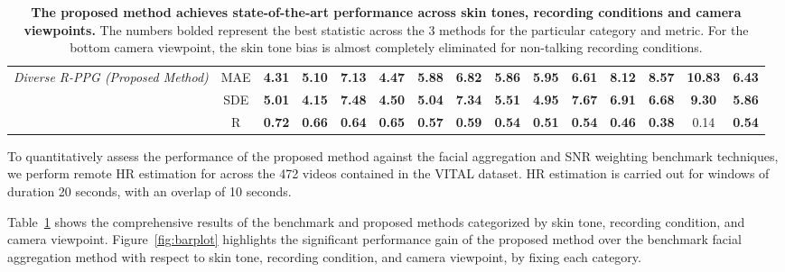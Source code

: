 \begin{table}[]
\begin{center}
{\begin{tabular}{c|c|ccccccccccccc}
\multirow{3}{3.5cm}{\textit{Diverse R-PPG (Proposed Method)}} & MAE & \textbf{4.31} & \textbf{5.10} & \multicolumn{1}{c|}{\textbf{7.13}} & \textbf{4.47} & \textbf{5.88} & \multicolumn{1}{c|}{\textbf{6.82}} & \textbf{5.86} & \textbf{5.95} & \multicolumn{1}{c|}{\textbf{6.61}} & \textbf{8.12} & \textbf{8.57} & \multicolumn{1}{c|}{\textbf{10.83}} & \textbf{6.43} \\
 & SDE & \textbf{5.01} & \textbf{4.15} & \multicolumn{1}{c|}{\textbf{7.48}} & \textbf{4.50} & \textbf{5.04} & \multicolumn{1}{c|}{\textbf{7.34}} & \textbf{5.51} & \textbf{4.95} & \multicolumn{1}{c|}{\textbf{7.67}} & \textbf{6.91} & \textbf{6.68} & \multicolumn{1}{c|}{\textbf{9.30}} & \textbf{5.86} \\
 & R & \textbf{0.72} & \textbf{0.66} & \multicolumn{1}{c|}{\textbf{0.64}} & \textbf{0.65} & \textbf{0.57} & \multicolumn{1}{c|}{\textbf{0.59}} & \textbf{0.54} & \textbf{0.51} & \multicolumn{1}{c|}{\textbf{0.54}} & \textbf{0.46} & \textbf{0.38} & \multicolumn{1}{c|}{0.14} & \textbf{0.54} \\ 
\end{tabular}}
\end{center}
\caption{\textbf{The proposed method achieves state-of-the-art performance across skin tones, recording conditions and camera viewpoints.} The numbers bolded represent the best statistic across the 3 methods for the particular category and metric. For the bottom camera viewpoint, the skin tone bias is almost completely eliminated for non-talking recording conditions.}
\label{tab:results}
\end{table}
    

To quantitatively assess the performance of the proposed method against the facial aggregation and SNR weighting benchmark techniques, we perform remote HR estimation for across the 472 videos contained in the VITAL dataset. HR estimation is carried out for windows of duration 20 seconds, with an overlap of 10 seconds. 

Table~\ref{tab:results} shows the comprehensive results of the benchmark and proposed methods categorized by skin tone, recording condition, and camera viewpoint. Figure~\ref{fig:barplot} highlights the significant performance gain of the proposed method over the benchmark facial aggregation method with respect to skin tone, recording condition, and camera viewpoint, by fixing each category. 

